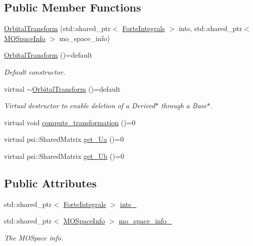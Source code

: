 \subsection*{Public Member Functions}
\begin{DoxyCompactItemize}
\item 
\mbox{\hyperlink{classforte_1_1_orbital_transform_ada3a71c5a0e8da563b984cfe6782e26f}{Orbital\+Transform}} (std\+::shared\+\_\+ptr$<$ \mbox{\hyperlink{classforte_1_1_forte_integrals}{Forte\+Integrals}} $>$ ints, std\+::shared\+\_\+ptr$<$ \mbox{\hyperlink{classforte_1_1_m_o_space_info}{M\+O\+Space\+Info}} $>$ mo\+\_\+space\+\_\+info)
\item 
\mbox{\hyperlink{classforte_1_1_orbital_transform_ad8deeadcd87504802278f656b9d8abcd}{Orbital\+Transform}} ()=default
\begin{DoxyCompactList}\small\item\em Default constructor. \end{DoxyCompactList}\item 
virtual \mbox{\hyperlink{classforte_1_1_orbital_transform_a5f537fe91199aaa005c923f32ec7d1ee}{$\sim$\+Orbital\+Transform}} ()=default
\begin{DoxyCompactList}\small\item\em Virtual destructor to enable deletion of a Derived$\ast$ through a Base$\ast$. \end{DoxyCompactList}\item 
virtual void \mbox{\hyperlink{classforte_1_1_orbital_transform_a48704cbce9fd066ef7e58270bb413c25}{compute\+\_\+transformation}} ()=0
\item 
virtual psi\+::\+Shared\+Matrix \mbox{\hyperlink{classforte_1_1_orbital_transform_aedd124480b35eba56653109578c05ec9}{get\+\_\+\+Ua}} ()=0
\item 
virtual psi\+::\+Shared\+Matrix \mbox{\hyperlink{classforte_1_1_orbital_transform_aeb179f5b68883cf346dde354c05fd27b}{get\+\_\+\+Ub}} ()=0
\end{DoxyCompactItemize}
\subsection*{Public Attributes}
\begin{DoxyCompactItemize}
\item 
std\+::shared\+\_\+ptr$<$ \mbox{\hyperlink{classforte_1_1_forte_integrals}{Forte\+Integrals}} $>$ \mbox{\hyperlink{classforte_1_1_orbital_transform_ac8ec571c856508d57f8a96f68e8eaffb}{ints\+\_\+}}
\item 
std\+::shared\+\_\+ptr$<$ \mbox{\hyperlink{classforte_1_1_m_o_space_info}{M\+O\+Space\+Info}} $>$ \mbox{\hyperlink{classforte_1_1_orbital_transform_ae1f7c618a926c324f20d67946ebec695}{mo\+\_\+space\+\_\+info\+\_\+}}
\begin{DoxyCompactList}\small\item\em The M\+O\+Space info. \end{DoxyCompactList}\end{DoxyCompactItemize}


